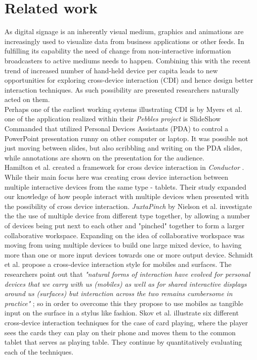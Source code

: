 \section{Related work} \label{sec:relatedwork}

As digital signage is an inherently visual medium, graphics and animations are increasingly used to visualize data from business applications or other feeds. In fulfilling its capability the need of change from non-interactive information broadcasters to active mediums needs to happen.  Combining this with the recent trend of increased number of hand-held device per capita leads to new opportunities for exploring cross-device interaction (CDI) and hence design better interaction techniques. As such possibility are presented researchers naturally acted on them.\\

Perhaps one of the earliest working systems illustrating CDI is by Myers et al. \cite{Myers:2001} one of the application realized within their \emph{Pebbles project} is SlideShow Commanded that utilized Personal Devices Assistants (PDA) to control a PowerPoint presentation runny on other computer or laptop. It was possible not just moving between slides, but also scribbling and writing on the PDA slides, while annotations are shown on the presentation for the audience.\\


Hamilton et al. created a framework for cross device interaction in \emph{Conductor} . \cite{Hamilton:2014} While their main focus here was creating cross device interaction between multiple interactive devices from the same type - tablets. Their study expanded our knowledge of how people interact with multiple devices when presented with the possibility of cross device interaction. \emph{JuxtaPinch} by Nielson et al. \cite{Nielsen:2014} investigate the the use of multiple device from different type together, by allowing a number of devices being put next to each other and "pinched" together to form a larger collaborative workspace. Expanding on the idea of collaborative workspace was moving from using multiple devices to build one large mixed device, to having more than one or more input devices towards one or more output device. Schmidt et al. propose a cross-device interaction style for mobiles and surfaces. The researchers point out that \emph{"natural forms of interaction have evolved for personal devices that we carry with us (mobiles) as well as for shared interactive displays around us (surfaces) but interaction across the two remains cumbersome in practice"} \cite{Schmidt:2012}; so in order to overcome this they propose to use mobiles as tangible input on the surface in a stylus like fashion. Skov et al. \cite{Skov:2015} illustrate six different cross-device interaction techniques for the case of card playing, where the player sees the cards they can play on their phone and moves them to the common tablet that serves as playing table. They continue by quantitatively evaluating each of the techniques.  \\


